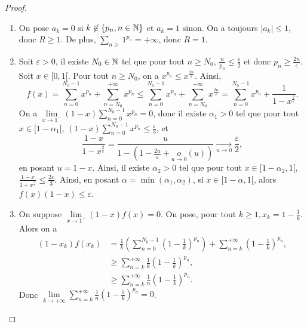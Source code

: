 \documentclass[12pt]{article}
\begin{document}
\begin{proof}
    \phantom{}
    \begin{enumerate}
        \item On pose $a_k=0$ si $k\not\in\left\lbrace p_n,n\in\mathbb{N}\right\rbrace$ et $a_k=1$ sinon. On a toujours $\left\lvert a_k\right\rvert\leqslant 1$, donc $R\geqslant1$. De plus, $\sum_{n\geqslant}1^{p_n}=+\infty$, donc $R=1$.
        \item Soit $\varepsilon>0$, il existe $N_{0}\in\mathbb{N}$ tel que pour tout $n\geqslant N_0$, $\frac{n}{p_n}\leqslant\frac{\varepsilon}{2}$ et donc $p_n\geqslant\frac{2n}{\varepsilon}$. Soit $x\in[0,1[$. Pour tout $n\geqslant N_0$, on a $x^{p_n}\leqslant x^{\frac{2n}{\varepsilon}}$. Ainsi,
        \begin{equation}
            f(x)=\sum_{n=0}^{N_0-1}x^{p_n}+\sum_{n=N_0}^{+\infty}x^{p_n}\leqslant\sum_{n=0}^{N_0-1}x^{p_n}+\sum_{n=N_0}^{+\infty}x^{\frac{2n}{\varepsilon}}=\sum_{n=0}^{N_0-1}x^{p_n}+\frac{1}{1-x^{\frac{2}{\varepsilon}}}.
        \end{equation}
        On a $\lim\limits_{x\to1^{-}}(1-x)\sum_{n=0}^{N_0-1}x^{p_n}=0$, donc il existe $\alpha_{1}>0$ tel que pour tout $x\in[1-\alpha_{1}[$, $(1-x)\sum_{n=0}^{N_0-1}x^{p_n}\leqslant\frac{\varepsilon}{3}$, et 
        \begin{equation}
            \frac{1-x}{1-x^{\frac{2}{\varepsilon}}}=\frac{u}{1-\left(1-\frac{2u}{\varepsilon}+\underset{u\to0}{o}(u)\right)}\xrightarrow[u\to0]{}\frac{\varepsilon}{2},
        \end{equation}
        en posant $u=1-x$. Ainsi, il existe $\alpha_{2}>0$ tel que pour tout $x\in[1-\alpha_{2},1[$, $\frac{1-x}{1+x^{\frac{2}{\varepsilon}}}\leqslant\frac{2\varepsilon}{3}$. Ainsi, en posant $\alpha=\min\left(\alpha_{1},\alpha_{2}\right)$, si $x\in[1-\alpha,1[$, alors $f(x)(1-x)\leqslant\varepsilon$.

        \item On suppose $\lim\limits_{x\to1^{-}}(1-x)f(x)=0$. On pose, pour tout $k\geqslant1,x_{k}=1-\frac{1}{k}$. Alors on a 
        \begin{align}
            (1-x_k)f(x_k)
            &=\frac{1}{k}\left(\sum_{n=0}^{N_0-1}\left(1-\frac{1}{k}\right)^{p_n}\right)+\sum_{n=k}^{+\infty}\left(1-\frac{1}{k}\right)^{p_n},\\
            &\geqslant \sum_{n=k}^{+\infty}\frac{1}{k}\left(1-\frac{1}{k}\right)^{p_n},\\
            &\geqslant\sum_{n=k}^{+\infty}\frac{1}{n}\left(1-\frac{1}{k}\right)^{p_n}.
        \end{align}
        Donc $\lim\limits_{k\to+\infty}\sum_{n=k}^{+\infty}\frac{1}{n}\left(1-\frac{1}{k}\right)^{p_n}=0$.

    \end{enumerate}
\end{proof}
\end{document}
